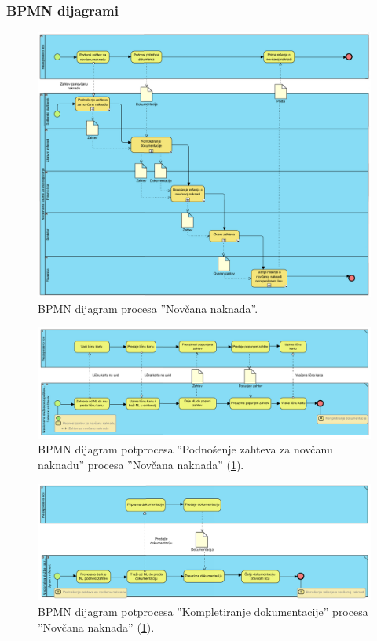 \begin{mylandscape}
	\subsubsection{BPMN dijagrami}
	
	\begin{figure}[H]
		\centering
		\includegraphics[width=0.5\paperwidth]{dijagrami/bpmn-dijagrami/bpmn-1.png}
		\caption{BPMN dijagram procesa ''Nov\v cana naknada''.}
		\label{bpmnd: novcana naknada}
	\end{figure}
	
	\newpage
	
	\begin{figure}[H]
		\centering
		\includegraphics[width=0.6\paperwidth]{dijagrami/bpmn-dijagrami/bpmn-2.png}
		\caption{BPMN dijagram potprocesa ''Podno\v senje zahteva za nov\v canu naknadu'' procesa ''Nov\v cana naknada'' (\ref{bpmnd: novcana naknada}).}
	\end{figure}
	
	\begin{figure}[H]
		\centering
		\includegraphics[width=0.6\paperwidth]{dijagrami/bpmn-dijagrami/bpmn-3.png}
		\caption{BPMN dijagram potprocesa ''Kompletiranje dokumentacije'' procesa ''Nov\v cana naknada'' (\ref{bpmnd: novcana naknada}).}
	\end{figure}


\end{mylandscape}
